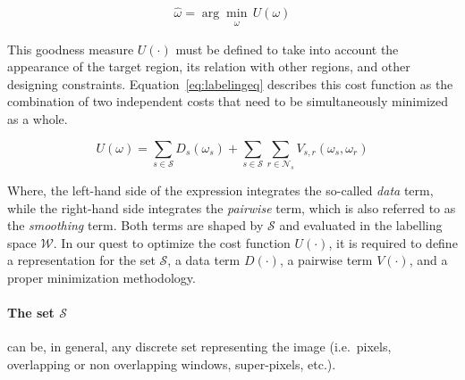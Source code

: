 \begin{equation}
\hat{\omega} = \arg \min_{\substack{\omega}} \,U(\omega)
\label{eq:costMin}
\end{equation}


This goodness measure $U(\cdot)$ must be defined to take into account the appearance of the target region, its relation with other regions, and other designing constraints.
Equation~\eqref{eq:labelingeq} describes this cost function as the combination of two independent costs that need to be simultaneously minimized as a whole.

\begin{equation}
  U(\omega) = \sum_{s\in \mathcal{S}} D_s(\omega_s) + \sum_{s \in \mathcal{S}}\sum_{r \in \mathcal{N}_{s}} V_{s,r}(\omega_s,\omega_r)
  \label{eq:labelingeq}
\end{equation}

Where, the left-hand side of the expression integrates the so-called \emph{data} term, while the right-hand side integrates the \emph{pairwise} term, which is also referred to as the \emph{smoothing} term.
Both terms are shaped by $\mathcal{S}$ and evaluated in the labelling space $\mathcal{W}$.
%
In our quest to optimize the cost function $U(\cdot)$, it is required to define a representation for the set $\mathcal{S}$, a data term $D(\cdot)$, a pairwise term $V(\cdot)$, and a proper minimization methodology.

\paragraph{The set $\mathcal{S}$}
can be, in general, any discrete set representing the image (i.e.\, pixels, overlapping or non overlapping windows, super-pixels, etc.).

